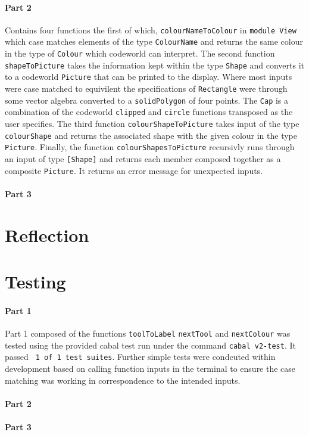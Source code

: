 \documentclass[11pt]{article}
\begin{document}
\paragraph{Part 2} Contains four functions the first of which, \verb|colourNameToColour| in \verb|module View| which case matches elements of the type \verb|ColourName| and returns the same colour in the type of \verb|Colour| which codeworld can interpret. The second function \verb|shapeToPicture| takes the information kept within the type \verb|Shape| and converts it to a codeworld \verb|Picture| that can be printed to the display. Where most inputs were case matched to equivilent the specifications of \verb|Rectangle| were through some vector algebra converted to a \verb|solidPolygon| of four points. The \verb|Cap| is a combination of the codeworld \verb|clipped| and \verb|circle| functions transposed as the user specifies. The third function \verb|colourShapeToPicture| takes input of the type \verb|colourShape| and returns the associated shape with the given colour in the type \verb|Picture|. Finally, the function \verb|colourShapesToPicture| recursivly runs through an input of type \verb|[Shape]| and returns each member composed together as a composite \verb|Picture|. It returns an error message for unexpected inputs.
\paragraph{Part 3}


\section*{Reflection}%



\section*{Testing}%
\paragraph{Part 1}
Part 1 composed of the functions \verb|toolToLabel| \verb|nextTool| and \verb|nextColour| was tested using the provided cabal test run under the command \verb|cabal v2-test|. It passed \verb| 1 of 1 test suites|. Further simple tests were condcuted within development based on calling function inputs in the terminal to ensure the case matching was working in correspondence to the intended inputs.
\paragraph{Part 2}
\paragraph{Part 3}



\end{document}
